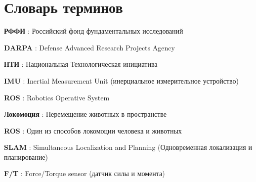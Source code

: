 \chapter*{Словарь терминов}             %
\textbf{РФФИ} : Российский фонд фундаментальных исследований

\textbf{DARPA} : Defense Advanced Research Projects Agency

\textbf{НТИ} : Национальная Технологическая инициатива

\textbf{IMU} : Inertial Measurement Unit (инерциальное измерительное устройство)

\textbf{ROS} : Robotics Operative System

\textbf{Локомоция} : Перемещение животных в пространстве

\textbf{ROS} : Один из способов локомоции человека и животных

\textbf{SLAM} : Simultaneous Localization and Planning (Одновременная локализация и планирование)

\textbf{F/T} : Force/Torque sensor (датчик силы и момента)

